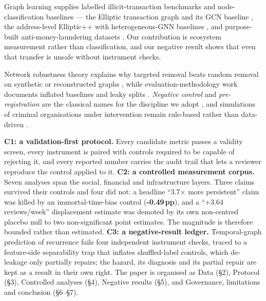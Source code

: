 Graph learning supplies labelled illicit-transaction benchmarks and
node-classification baselines --- the Elliptic transaction graph and its GCN
baseline \citep{weber2019antimoney}, the address-level Elliptic++ with
heterogeneous-GNN baselines \citep{elmougy2023demystifying}, and purpose-built
anti-money-laundering datasets \citep{xiang2023babd,schnoering2025bitcoin}. Our
contribution is ecosystem measurement rather than classification, and our
negative result shows that even that transfer is unsafe without instrument
checks.

Network robustness theory explains why targeted removal beats random removal on
synthetic or reconstructed graphs \citep{albert2000error,ren2019generalized,duxbury2020responsiveness,cavallaro2020disrupting},
while evaluation-methodology work documents inflated baselines and leaky splits
\citep{shchur2018pitfalls,kapoor2023leakage,errica2019fair}. \emph{Negative
control} and \emph{pre-registration} are the classical names for the discipline
we adopt \citep{lipsitch2010negative,nosek2018preregistration}, and simulations
of criminal organisations under intervention remain rule-based rather than
data-driven \citep{manzi2024agentbased}.

\textbf{C1: a validation-first protocol.} Every candidate metric passes a
validity screen, every instrument is paired with controls required to be capable
of rejecting it, and every reported number carries the audit trail that lets a
reviewer reproduce the control applied to it. \textbf{C2: a controlled
measurement corpus.} Seven analyses span the social, financial and
infrastructure layers. Three claims survived their controls and four did not: a
headline ``3.7$\times$ more persistent'' claim was killed by an
immortal-time-bias control (\textbf{-0.49\,pp}), and a ``+3.64 reviews/week''
displacement estimate was demoted by its own non-centred placebo null to two
non-significant point estimates. The magnitude is therefore bounded rather than
estimated. \textbf{C3: a negative-result ledger.} Temporal-graph prediction of
recurrence fails four independent instrument checks, traced to a feature-side
separability trap that inflates shuffled-label controls, which de-leakage only
partially repairs; the hazard, its diagnosis and its partial repair are kept as
a result in their own right. The paper is organised as Data (\S2), Protocol
(\S3), Controlled analyses (\S4), Negative results (\S5), and Governance,
limitations and conclusion (\S6--\S7).

